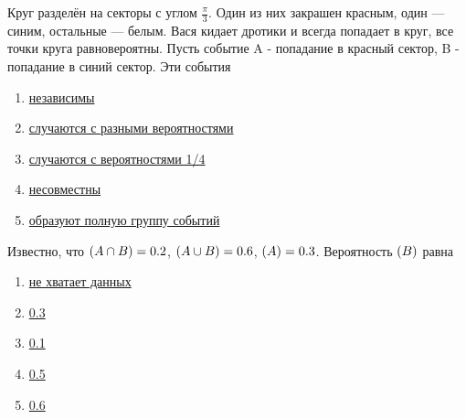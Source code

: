 \documentclass[t]{beamer}
\let\P\relax
\DeclareMathOperator{\P}{\mathbb{P}}
\begin{document}
 \begin{frame} \label{10} 
\begin{block}{10} 

Круг разделён на секторы с углом $\frac{\pi}{3}$. Один из них закрашен красным, один — синим, остальные — белым. Вася кидает дротики и всегда попадает в круг, все точки круга равновероятны. Пусть событие A - попадание в красный сектор, B - попадание в синий сектор. Эти события

  


 \end{block} 
\begin{enumerate} 
\item[] \hyperlink{10-No}{\beamergotobutton{} независимы}
\item[] \hyperlink{10-No}{\beamergotobutton{} случаются с разными вероятностями}
\item[] \hyperlink{10-No}{\beamergotobutton{} случаются с вероятностями 1/4}
\item[] \hyperlink{10-Yes}{\beamergotobutton{} несовместны}
\item[] \hyperlink{10-No}{\beamergotobutton{} образуют полную группу событий}
\end{enumerate} 
\end{frame} 


 \begin{frame} \label{11} 
\begin{block}{11} 

Известно, что $\P(A \cap B) = 0.2$, $\P(A \cup B) = 0.6$, $\P(A) = 0.3$. Вероятность $\P(B)$ равна

  


 \end{block} 
\begin{enumerate} 
\item[] \hyperlink{11-No}{\beamergotobutton{} не хватает данных}
\item[] \hyperlink{11-No}{\beamergotobutton{} 0.3}
\item[] \hyperlink{11-No}{\beamergotobutton{} 0.1}
\item[] \hyperlink{11-Yes}{\beamergotobutton{} 0.5}
\item[] \hyperlink{11-No}{\beamergotobutton{} 0.6}
\end{enumerate} 
\end{frame} 
\end{document}
